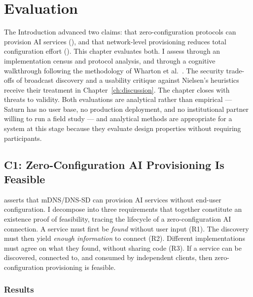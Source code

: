 \chapter{Evaluation}
\label{ch:evaluation}

The Introduction advanced two claims: that zero-configuration protocols can provision AI services (), and that network-level provisioning reduces total configuration effort (). This chapter evaluates both. I assess  through an implementation census and protocol analysis, and  through a cognitive walkthrough following the methodology of Wharton et al.~\cite{wharton1994walkthrough}. The security trade-offs of broadcast discovery and a usability critique against Nielsen's heuristics~\cite{nielsen1994heuristics} receive their treatment in Chapter~\ref{ch:discussion}. The chapter closes with threats to validity. Both evaluations are analytical rather than empirical --- Saturn has no user base, no production deployment, and no institutional partner willing to run a field study --- and analytical methods are appropriate for a system at this stage because they evaluate design properties without requiring participants.

\section{C1: Zero-Configuration AI Provisioning Is Feasible}
\label{sec:eval-c1}

 asserts that mDNS/DNS-SD can provision AI services without end-user configuration. I decompose  into three requirements that together constitute an existence proof of feasibility, tracing the lifecycle of a zero-configuration AI connection. A service must first be \emph{found} without user input (R1). The discovery must then yield \emph{enough information} to connect (R2). Different implementations must agree on what they found, without sharing code (R3). If a service can be discovered, connected to, and consumed by independent clients, then zero-configuration provisioning is feasible.

\subsection{Results}

